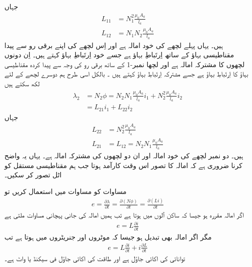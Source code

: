 جہاں
\begin{align}
L_{11}&=N_1^2  \frac{\mu_0 A_a}{l_a}\\
L_{12}&=N_1 N_2  \frac{\mu_0 A_a}{l_a}
\end{align}
ہیں۔ یہاں  پہلے لچھے کی  خود امالہ  ہے اور   اِس لچھے کی اپنے برقی رو  سے پیدا مقناطیسی بہاؤ  کے ساتھ  اِرتَباطِ بہاؤ ہے جسے خود اِرتَباطِ بہاؤ کہتے ہیں۔  اِن دونوں لچھوں  کا  مشترکہ امالہ ہے اور    لچھا نمبر-1  کے ساتھ برقی رو   کی وجہ سے پیدا کردہ مقناطیسی بہاؤ  کا اِرتَباطِ بہاؤ  ہے جسے مشترکہ اِرتَباطِ بہاؤ  کہتے ہیں ۔ بالکل اسی طرح ہم دوسرے لچھے کے لئے لکھ سکتے ہیں
\begin{align}
\lambda_2&=N_2 \phi=N_2 N_1 \frac{\mu_0 A_a}{l_a} i_1+N_2^2 \frac{\mu_0 A_a}{l_a} i_2\\
&=L_{21} i_1+L_{22} i_2
\end{align}
جہاں
\begin{align}
L_{22}&=N_2^2 \frac{\mu_0 A_a}{l_a}\\
L_{21}&=L_{12}=N_2 N_1 \frac{\mu_0 A_a}{l_a}
\end{align}
ہیں۔ دو نمبر لچھے  کی خود امالہ اور   ان  دو لچھوں کی مشترکہ امالہ ہے۔ یہاں یہ واضح کرنا ضروری ہے کہ امالہ کا تصور اس وقت کارآمد ہوتا جب ہم مقناطیسی مستقل   کو اٹل تصور کر سکیں۔

مساوات  کو مساوات  میں استعمال کریں تو 
\begin{align}
e=\frac{\partial \lambda}{\partial t}=\frac{ \partial \left (N \phi \right)}{\partial t}=\frac{\partial \left( L i\right) }{\partial t}
\end{align}
اگر امالہ مقررہ ہو جیسا کہ ساکن آلوں میں ہوتا ہے تب ہمیں  امالہ کی جانی پہچانی مساوات ملتی ہے 
\begin{align}
e=L \frac{\partial i}{\partial t}
\end{align}
مگر اگر امالہ بھی تبدیل ہو جیسا کہ موٹروں اور جنریٹروں میں ہوتا ہے تب
\begin{align}
e= L \frac{\partial i}{\partial t} + i \frac{\partial L}{\partial t}
\end{align}
توانائی  کی اکائی جاؤل  ہے اور طاقت  کی اکائی جاؤل فی سیکنڈ یا واٹ   ہے۔

